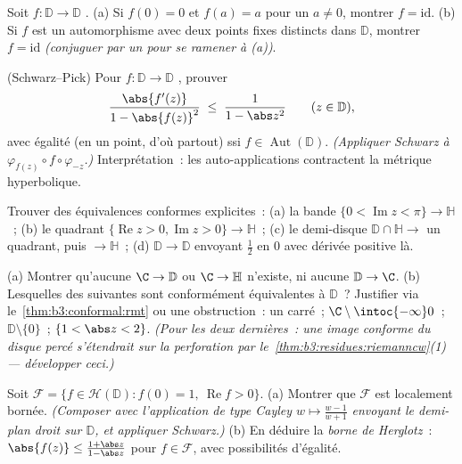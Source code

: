 \begin{exercise}[$\star$]\label{exo:b3:conformal:2}
Soit $f \colon \mathbb D \to \mathbb D$ .
(a) Si $f(0) = 0$ et $f(a) = a$ pour un $a \neq 0$, montrer
$f = \mathrm{id}$.
(b) Si $f$ est un automorphisme avec deux points fixes
distincts dans $\mathbb D$, montrer $f = \mathrm{id}$
\emph{(conjuguer par un  pour se ramener
à (a))}.
\end{exercise}

\begin{exercise}[$\star\star$]\label{exo:b3:conformal:3}
(Schwarz--Pick) Pour $f\colon \mathbb D \to \mathbb D$
, prouver
\[
\frac{\abs{f'(z)}}{1 - \abs{f(z)}^2} \;\leq\;
\frac{1}{1 - \abs z^2}
\qquad (z \in \mathbb D),
\]
avec égalité (en un point, d'où partout) ssi $f \in
\operatorname{Aut}(\mathbb D)$.
\emph{(Appliquer Schwarz à $\varphi_{f(z)}\circ
f\circ\varphi_{-z}$.)} Interprétation~: les auto-applications
 contractent la métrique hyperbolique.
\end{exercise}

\begin{exercise}[$\star\star$]\label{exo:b3:conformal:4}
Trouver des équivalences conformes explicites~:
(a) la bande $\{0 < \operatorname{Im}z < \pi\} \to \mathbb
H$~;
(b) le quadrant $\{\operatorname{Re}z > 0,
\operatorname{Im}z > 0\} \to \mathbb H$~;
(c) le demi-disque $\mathbb D\cap\mathbb H \to$ un quadrant,
puis $\to \mathbb H$~;
(d) $\mathbb D \to \mathbb D$ envoyant $\frac12$ en $0$ avec
dérivée positive là.
\end{exercise}

\begin{exercise}[$\star\star$]\label{exo:b3:conformal:5}
(a) Montrer qu'aucune  $\C \to \mathbb D$
ou $\C \to \mathbb H$ n'existe, ni aucune $\mathbb D \to
\C$.
(b) Lesquelles des suivantes sont conformément équivalentes
à $\mathbb D$~? Justifier via le~\cref{thm:b3:conformal:rmt}
ou une obstruction~: un carré~;
$\C\setminus\intoc{-\infty}0$~; $\mathbb D\setminus\{0\}$~;
$\{1 < \abs z < 2\}$.
\emph{(Pour les deux dernières~: une image conforme du
disque percé s'étendrait sur la perforation par
le~\cref{thm:b3:residues:riemanncw}(1) --- développer
ceci.)}
\end{exercise}

\begin{exercise}[$\star\star$]\label{exo:b3:conformal:6}
Soit $\mathcal F = \{f \in \mathcal H(\mathbb D) : f(0) =
1,\ \operatorname{Re}f > 0\}$.
(a) Montrer que $\mathcal F$ est localement bornée.
\emph{(Composer avec l'application de type Cayley $w \mapsto
\frac{w - 1}{w + 1}$ envoyant le demi-plan droit sur
$\mathbb D$, et appliquer Schwarz.)}
(b) En déduire la \emph{borne de Herglotz}~: $\abs{f(z)}
\leq \frac{1 + \abs z}{1 - \abs z}$ pour $f \in \mathcal F$,
avec possibilités d'égalité.
\end{exercise}

